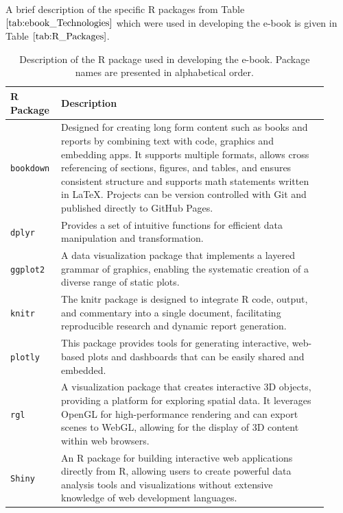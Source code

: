 \documentclass[11pt]{article}
\begin{document}
A brief description of the specific R packages from Table $\ref{tab:ebook_Technologies}$ which were used in developing the e-book is given in Table $\ref{tab:R_Packages}$.
\renewcommand\arraystretch{1.10}
\begin{table}[H]
\setlength{\belowcaptionskip}{-25pt}
\begin{center}
\begin{tabular}{| p{0.125\linewidth} | p{0.80\linewidth} |}
\hline
\textbf{R Package}	&	\textbf{Description}\\
\hline
\texttt{bookdown}	&	Designed for creating long form content such as books and reports by combining text with code, graphics and embedding apps. It supports multiple formats, allows cross referencing of sections, figures, and tables, and ensures consistent structure and supports math statements written in LaTeX. Projects can be version controlled with Git and published directly to GitHub Pages.\\
\hline
\texttt{dplyr}		&	Provides a set of intuitive functions for efficient data manipulation and transformation.\\
\hline
\texttt{ggplot2}		&	A data visualization package that implements a layered grammar of graphics, enabling the systematic creation of a diverse range of static plots.\\
\hline
\texttt{knitr}		&	The knitr package is designed to integrate R code, output, and commentary into a single document, facilitating reproducible research and dynamic report generation.\\
\hline
\texttt{plotly}		&	This package provides tools for generating interactive, web-based plots and dashboards that can be easily shared and embedded.\\
\hline
\texttt{rgl}			&	A visualization package that creates interactive 3D objects, providing a platform for exploring spatial data. It leverages OpenGL for high-performance rendering and can export scenes to WebGL, allowing for the display of 3D content within web browsers.\\
\hline
\texttt{Shiny}		&	An R package for building interactive web applications directly from R, allowing users to create powerful data analysis tools and visualizations without extensive knowledge of web development languages.\\
\hline
\end{tabular}
\caption{Description of the R package used in developing the e-book. Package names are presented in alphabetical order.}
\label{tab:R_Packages}
\end{center}
\end{table}
\end{document}

